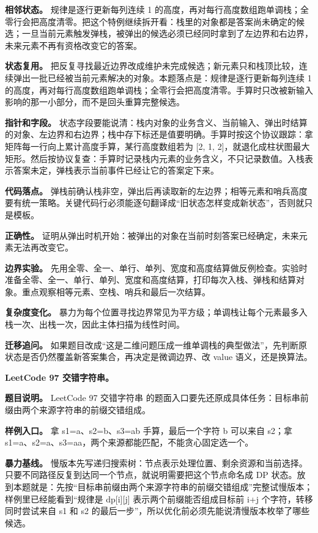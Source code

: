 \textbf{相邻状态。} 规律是逐行更新每列连续 1 的高度，再对每行高度数组跑单调栈；全零行会把高度清零。把这个特例继续拆开看：栈里的对象都是答案尚未确定的候选；一旦当前元素触发弹栈，被弹出的候选必须已经同时拿到了左边界和右边界，未来元素不再有资格改变它的答案。

\textbf{状态复用。} 把反复寻找最近边界改成维护未完成候选；新元素只和栈顶比较，连续弹出一批已经被当前元素解决的对象。本题落点是：规律是逐行更新每列连续 1 的高度，再对每行高度数组跑单调栈；全零行会把高度清零。手算时只改被新输入影响的那一小部分，而不是回头重算完整候选。

\textbf{指针和字段。} 状态字段要能说清：栈内对象的业务含义、当前输入、弹出时结算的对象、左边界和右边界；栈中存下标还是值要明确。手算时按这个协议跟踪：拿矩阵每一行向上累计高度手算，某行高度数组若为 [2, 1, 2]，就退化成柱状图最大矩形。然后按协议复查：手算时记录栈内元素的业务含义，不只记录数值。入栈表示答案未定，弹栈表示当前事件已经让它的答案定下来。

\textbf{代码落点。} 弹栈前确认栈非空，弹出后再读取新的左边界；相等元素和哨兵高度要有统一策略。关键代码行必须能逐句翻译成“旧状态怎样变成新状态”，否则就只是模板。

\textbf{正确性。} 证明从弹出时机开始：被弹出的对象在当前时刻答案已经确定，未来元素无法再改变它。

\textbf{边界实验。} 先用全零、全一、单行、单列、宽度和高度结算做反例检查。实验时准备全零、全一、单行、单列、宽度和高度结算，打印每次入栈、弹栈和结算对象。重点观察相等元素、空栈、哨兵和最后一次结算。

\textbf{复杂度变化。} 暴力为每个位置寻找边界常见为平方级；单调栈让每个元素最多入栈一次、出栈一次，因此主体扫描为线性时间。

\textbf{迁移追问。} 如果题目改成“这是二维问题压成一维单调栈的典型做法”，先判断原状态是否仍然覆盖新答案集合，再决定是微调边界、改 value 语义，还是换算法。

\noindent\textbf{LeetCode 97 交错字符串。}

\textbf{题目说明。} LeetCode 97 交错字符串 的题面入口要先还原成具体任务：目标串前缀由两个来源字符串的前缀交错组成。

\textbf{样例入口。} 拿 s1=a、s2=b、s3=ab 手算，最后一个字符 b 可以来自 s2；拿 s1=a、s2=a、s3=aa，两个来源都能匹配，不能贪心固定选一个。

\textbf{暴力基线。} 慢版本先写递归搜索树：节点表示处理位置、剩余资源和当前选择。只要不同路径反复到达同一个节点，就说明需要把这个节点命名成 DP 状态。放到本题就是：先按“目标串前缀由两个来源字符串的前缀交错组成”完整试慢版本；样例里已经能看到“规律是 dp[i][j] 表示两个前缀能否组成目标前 i+j 个字符，转移同时尝试来自 s1 和 s2 的最后一步”，所以优化前必须先能说清慢版本枚举了哪些候选。

